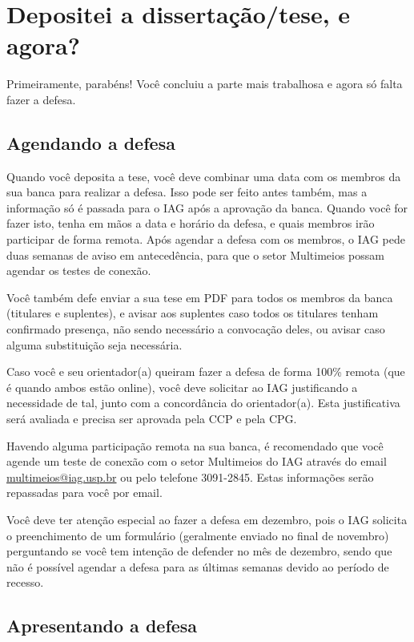   \section{Depositei a dissertação/tese, e agora?}
    Primeiramente, parabéns! Você concluiu a parte mais trabalhosa e agora só falta fazer a defesa.

    \subsection{Agendando a defesa}

      Quando você deposita a tese, você deve combinar uma data com os membros da sua banca para realizar a defesa. Isso pode ser feito antes também, mas a informação só é passada para o IAG após a aprovação da banca. Quando você for fazer isto, tenha em mãos a data e horário da defesa, e quais membros irão participar de forma remota. Após agendar a defesa com os membros, o IAG pede duas semanas de aviso em antecedência, para que o setor Multimeios possam agendar os testes de conexão.

      Você também defe enviar a sua tese em PDF para todos os membros da banca (titulares e suplentes), e avisar aos suplentes caso todos os titulares tenham confirmado presença, não sendo necessário a convocação deles, ou avisar caso alguma substituição seja necessária.

      Caso você e seu orientador(a) queiram fazer a defesa de forma 100\% remota (que é quando ambos estão online), você deve solicitar ao IAG justificando a necessidade de tal, junto com a concordância do orientador(a). Esta justificativa será avaliada e precisa ser aprovada pela CCP e pela CPG.

      Havendo alguma participação remota na sua banca, é recomendado que você agende um teste de conexão com o setor Multimeios do IAG através do email \url{multimeios@iag.usp.br} ou pelo telefone 3091-2845. Estas informações serão repassadas para você por email.

      Você deve ter atenção especial ao fazer a defesa em dezembro, pois o IAG solicita o preenchimento de um formulário (geralmente enviado no final de novembro) perguntando se você tem intenção de defender no mês de dezembro, sendo que não é possível agendar a defesa para as últimas semanas devido ao período de recesso.

    \subsection{Apresentando a defesa}

